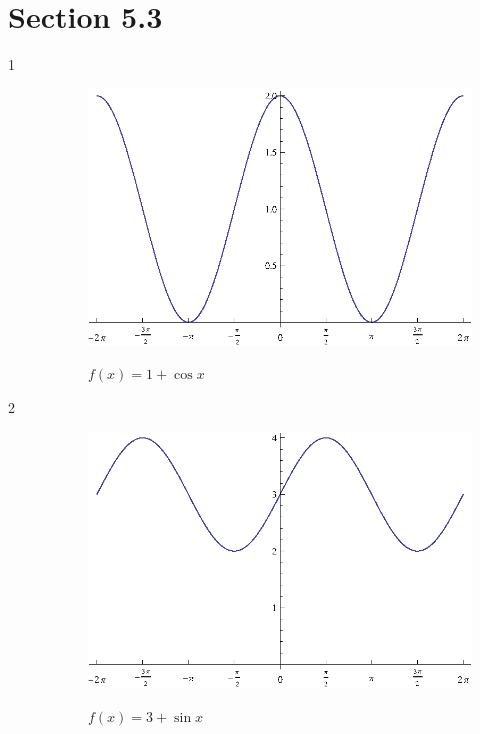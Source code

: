 \documentclass{exam}
\begin{document}
    \section{Section 5.3}
    \begin{description}

      \item[1]
        \begin{figure}[H]
          \centering
          \includegraphics[scale=0.8]{exercise01.eps}

          $f(x) = 1 + \cos x$
        \end{figure}

      \item[2]
        \begin{figure}[H]
          \centering
          \includegraphics[scale=0.8]{exercise02.eps}

          $f(x) = 3 + \sin x$
        \end{figure}


\end{description}
\end{document}
